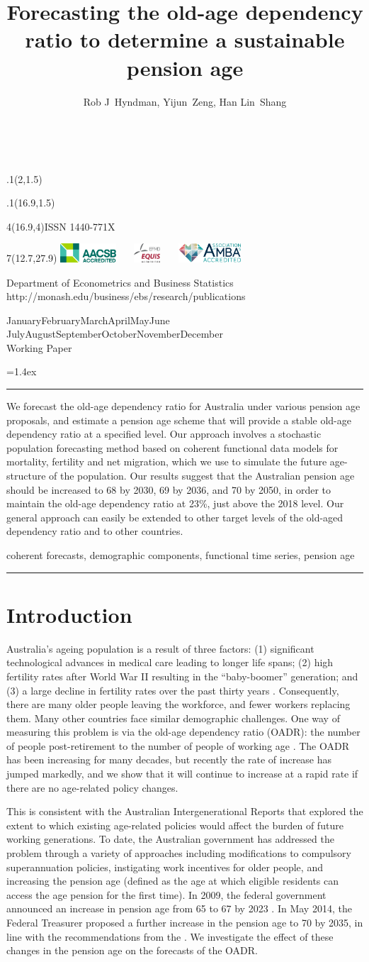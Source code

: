 \documentclass[11pt,a4paper,]{article}
\title{Forecasting the old-age dependency ratio to determine a sustainable pension age}
\author{Rob J~Hyndman, Yijun~Zeng, Han Lin~Shang}
\date{\sf\Date~\Month~\Year}
\makeatletter
\def\Date{\number\day}
\def\Month{\ifcase\month\or
 January\or February\or March\or April\or May\or June\or
 July\or August\or September\or October\or November\or December\fi}
\def\Year{\number\year}
\def\showjel{{\large\textsf{\textbf{JEL classification:}}~\@jel}}
\def\cover{{\sffamily\setcounter{page}{0}
        \thispagestyle{empty}
        \placefig{2}{1.5}{width=5cm}{monash2}
        \placefig{16.9}{1.5}{width=2.1cm}{MBusSchool}
        \begin{textblock}{4}(16.9,4)ISSN 1440-771X\end{textblock}
        \begin{textblock}{7}(12.7,27.9)\hfill
        \includegraphics[height=0.7cm]{AACSB}~~~
        \includegraphics[height=0.7cm]{EQUIS}~~~
        \includegraphics[height=0.7cm]{AMBA}
        \end{textblock}
        \vspace*{2cm}
        \begin{center}\Large
        Department of Econometrics and Business Statistics\\[.5cm]
        \footnotesize http://monash.edu/business/ebs/research/publications
        \end{center}\vspace{2cm}
        \begin{center}
        \fbox{\parbox{14cm}{\begin{onehalfspace}\centering\Huge\vspace*{0.3cm}
                \textsf{\textbf{\expandafter{\@title}}}\vspace{1cm}\par
                \LARGE\@author\end{onehalfspace}
        }}
        \end{center}
        \vfill
                \begin{center}\Large
                \Month~\Year\\[1cm]
                Working Paper \@wp
        \end{center}\vspace*{2cm}}}
\def\pageone{{\sffamily\setstretch{1}%
        \thispagestyle{empty}%
        \vbox to \textheight{%
        \raggedright\baselineskip=1.2cm
     {\fontsize{24.88}{30}\sffamily\textbf{\expandafter{\@title}}}
        \vspace{2cm}\par
        \hspace{1cm}\parbox{14cm}{\sffamily\large\@addresses}\vspace{1cm}\vfill
        \hspace{1cm}{\large\Date~\Month~\Year}\\[1cm]
        \hspace{1cm}\showjel\vss}}}
\def\blindtitle{{\sffamily
     \thispagestyle{plain}\raggedright\baselineskip=1.2cm
     {\fontsize{24.88}{30}\sffamily\textbf{\expandafter{\@title}}}\vspace{1cm}\par
        }}
\def\titlepage{{\cover\newpage\pageone\newpage\blindtitle}}
\let\maketitle\titlepage
\newenvironment{keywords}{\par\vspace{0.5cm}\noindent{\sffamily\textbf{Keywords:}}}{\vspace{0.25cm}\par\hrule\vspace{0.5cm}\par}
\renewenvironment{abstract}{\begin{minipage}{\textwidth}\parskip=1.4ex\noindent
\hrule\vspace{0.1cm}\par{\sffamily\textbf{\abstractname}}\newline}
  {\end{minipage}}
\def\placefig#1#2#3#4{\begin{textblock}{.1}(#1,#2)\rlap{\texttt{[image: \#4]}}\end{textblock}}
\makeatother
\begin{document}
\maketitle
\begin{abstract}
We forecast the old-age dependency ratio for Australia under various pension age proposals, and estimate a pension age scheme that will provide a stable old-age dependency ratio at a specified level. Our approach involves a stochastic population forecasting method based on coherent functional data models for mortality, fertility and net migration, which we use to simulate the future age-structure of the population. Our results suggest that the Australian pension age should be increased to 68 by 2030, 69 by 2036, and 70 by 2050, in order to maintain the old-age dependency ratio at 23\%, just above the 2018 level. Our general approach can easily be extended to other target levels of the old-aged dependency ratio and to other countries.
\end{abstract}
\begin{keywords}
coherent forecasts, demographic components, functional time series, pension age
\end{keywords}

\hypertarget{introduction}{%
\section{Introduction}\label{introduction}}

Australia's ageing population is a result of three factors: (1) significant technological advances in medical care leading to longer life spans; (2) high fertility rates after World War II resulting in the ``baby-boomer'' generation; and (3) a large decline in fertility rates over the past thirty years \autocite{Fehr2008}. Consequently, there are many older people leaving the workforce, and fewer workers replacing them. Many other countries face similar demographic challenges. One way of measuring this problem is via the old-age dependency ratio (OADR): the number of people post-retirement to the number of people of working age \autocite{Walker1982}. The OADR has been increasing for many decades, but recently the rate of increase has jumped markedly, and we show that it will continue to increase at a rapid rate if there are no age-related policy changes.

This is consistent with the Australian Intergenerational Reports \autocite{IGR02,IGR07,Swan2010} that explored the extent to which existing age-related policies would affect the burden of future working generations. To date, the Australian government has addressed the problem through a variety of approaches including modifications to compulsory superannuation policies, instigating work incentives for older people, and increasing the pension age (defined as the age at which eligible residents can access the age pension for the first time). In 2009, the federal government announced an increase in pension age from 65 to 67 by 2023 \autocite{Nielson2010}. In May 2014, the Federal Treasurer proposed a further increase in the pension age to 70 by 2035, in line with the recommendations from the \textcite{PC13}. We investigate the effect of these changes in the pension age on the forecasts of the OADR.
\end{document}
